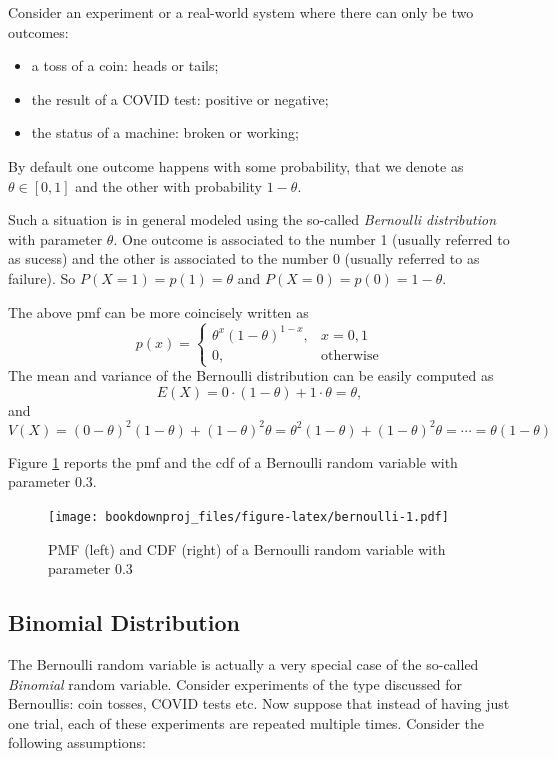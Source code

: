 \documentclass[
]{book}
\theoremstyle{definition}
\theoremstyle{definition}
\theoremstyle{definition}
\theoremstyle{definition}
\theoremstyle{remark}
\begin{document}
Consider an experiment or a real-world system where there can only be two outcomes:

\begin{itemize}
\item
  a toss of a coin: heads or tails;
\item
  the result of a COVID test: positive or negative;
\item
  the status of a machine: broken or working;
\end{itemize}

By default one outcome happens with some probability, that we denote as \(\theta\in [0,1]\) and the other with probability \(1-\theta\).

Such a situation is in general modeled using the so-called \emph{Bernoulli distribution} with parameter \(\theta\). One outcome is associated to the number 1 (usually referred to as sucess) and the other is associated to the number 0 (usually referred to as failure). So \(P(X=1)=p(1)=\theta\) and \(P(X=0)=p(0)=1-\theta\).

The above pmf can be more coincisely written as
\[
p(x)=\left\{
\begin{array}{ll}
\theta^x(1-\theta)^{1-x}, & x=0,1\\
0, & \mbox{otherwise}
\end{array}
\right.
\]
The mean and variance of the Bernoulli distribution can be easily computed as
\[
E(X)=0\cdot(1-\theta)+ 1\cdot\theta=\theta,
\]
and
\[
V(X)=(0-\theta)^2(1-\theta)+(1-\theta)^2\theta=\theta^2(1-\theta)+(1-\theta)^2\theta=\cdots = \theta(1-\theta)
\]

Figure \ref{fig:bernoulli} reports the pmf and the cdf of a Bernoulli random variable with parameter 0.3.

\begin{figure}
\centering
\texttt{[image: bookdownproj\_files/figure-latex/bernoulli-1.pdf]}
\caption{\label{fig:bernoulli}PMF (left) and CDF (right) of a Bernoulli random variable with parameter 0.3}
\end{figure}

\hypertarget{binomial-distribution}{%
\subsection{Binomial Distribution}\label{binomial-distribution}}

The Bernoulli random variable is actually a very special case of the so-called \emph{Binomial} random variable. Consider experiments of the type discussed for Bernoullis: coin tosses, COVID tests etc. Now suppose that instead of having just one trial, each of these experiments are repeated multiple times. Consider the following assumptions:
\end{document}
